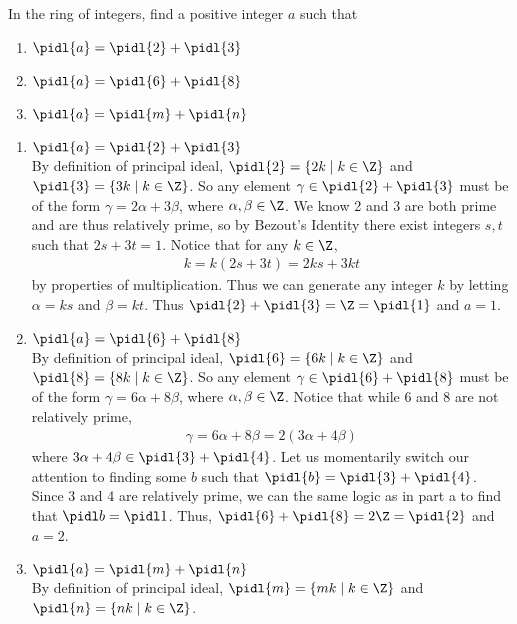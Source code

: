 \documentclass{article}
\begin{document}
In the ring of integers, find a positive integer \( a \) such that
\begin{enumerate}[label=\bd{\alph*.}]
  \item \( \pidl{a} = \pidl{2} + \pidl{3} \)
  \item \( \pidl{a} = \pidl{6} + \pidl{8} \)
  \item \( \pidl{a} = \pidl{m} + \pidl{n} \)
\end{enumerate}

\begin{solution} %
\begin{enumerate}[label=\bd{\alph*.}]
  \item \( \pidl{a} = \pidl{2} + \pidl{3} \) \\
    By definition of principal ideal, \( \pidl{2}=\{2k\mid k\in\Z\} \) and \( \pidl{3}=\{3k\mid k\in\Z\} \).
    So any element \(\gamma\in \pidl{2} + \pidl{3} \) must be of the form \( \gamma=2\alpha+3\beta \), where \( \alpha,\beta\in\Z \).
    We know 2 and 3 are both prime and are thus relatively prime, so by Bezout's Identity there exist integers \( s,t \) such that \( 2s+3t=1 \). Notice that for any \( k\in\Z \), \begin{align*}
      k = k(2s+3t) = 2ks+3kt
    \end{align*} by properties of multiplication.
    Thus we can generate any integer \( k \) by letting \( \alpha = ks \) and \( \beta = kt \).
    Thus \( \pidl{2}+\pidl{3} = \Z = \pidl{1} \) and \( a=1 \).
  \item \( \pidl{a} = \pidl{6} + \pidl{8} \) \\
    By definition of principal ideal, \( \pidl{6}=\{6k\mid k\in\Z\} \) and \( \pidl{8}=\{8k\mid k\in\Z\} \).
    So any element \(\gamma\in\pidl{6} + \pidl{8} \) must be of the form \( \gamma=6\alpha+8\beta \), where \( \alpha,\beta\in\Z \). Notice that while 6 and 8 are not relatively prime, \begin{align*}
      \gamma=6\alpha+8\beta= 2(3\alpha+4\beta)
    \end{align*} where \( 3\alpha+4\beta \in \pidl{3}+\pidl{4} \).
    Let us momentarily switch our attention to finding some \( b \) such that \(\pidl{b} = \pidl{3}+\pidl{4} \).
    Since 3 and 4 are relatively prime, we can the same logic as in part a to find that \( \pidl b = \pidl 1 \).
    Thus, \( \pidl{6}+\pidl{8} = 2\Z = \pidl{2} \) and \( a=2 \).
  \item \( \pidl{a} = \pidl{m} + \pidl{n} \) \\
    By definition of principal ideal, \( \pidl{m}=\{mk\mid k\in\Z\} \) and \( \pidl{n}=\{nk\mid k\in\Z\} \).

\end{enumerate}
\end{solution}
\end{document}
